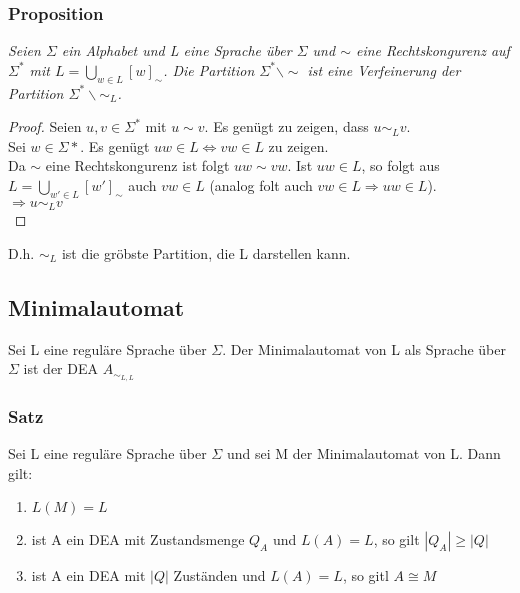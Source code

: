     \subsubsection*{Proposition}
        \textit{Seien \(\Sigma\) ein Alphabet und L eine Sprache über \(\Sigma\) und \(\sim\) eine Rechtskongurenz auf \(\Sigma^*\) mit \(L=\bigcup_{w\in L}[w]_\sim\). Die Partition \(\Sigma^*\backslash\sim\) ist eine Verfeinerung der Partition \(\Sigma^*\backslash\sim_L\).}\par\bigskip
    \begin{proof}
        Seien \(u,v\in\Sigma^*\) mit \(u\sim v\). Es genügt zu zeigen, dass \(u\sim_Lv\).\\
        Sei \(w\in\Sigma*\). Es genügt \(uw\in L\Leftrightarrow vw\in L\) zu zeigen.\\
        Da \(\sim\) eine Rechtskongurenz ist folgt \(uw\sim vw\). Ist \(uw\in L\), so folgt aus \(L=\bigcup_{w'\in L}[w']_\sim\) auch \(vw\in L\) (analog folt auch \(vw\in L\Rightarrow uw\in L\)).\\
        \(\Rightarrow u\sim_Lv\)\\
    \end{proof}
        D.h. \(\sim_L\) ist die gröbste Partition, die L darstellen kann.
\subsection{Minimalautomat}
    Sei L eine reguläre Sprache über \(\Sigma\). Der Minimalautomat von L als Sprache über \(\Sigma\) ist der DEA \(A_{\sim_{L,L}}\)
    \subsubsection*{Satz}
        Sei L eine reguläre Sprache über \(\Sigma\) und sei M der Minimalautomat von L. Dann gilt:
        \begin{enumerate}
            \item \(L(M)=L\)
            \item ist A ein DEA mit Zustandsmenge \(Q_A\) und \(L(A)=L\), so gilt \(|Q_A|\geq|Q|\)
            \item ist A ein DEA mit \(|Q|\) Zuständen und \(L(A)=L\), so gitl \(A\cong M\) 
        \end{enumerate}